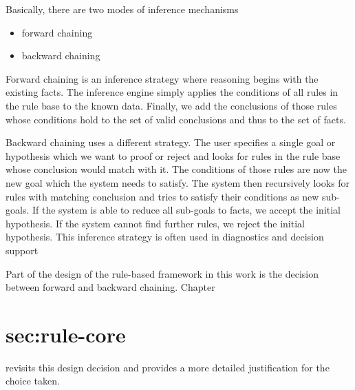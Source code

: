 Basically, there are two modes of inference mechanisms\cite{https://doi.org/10.1002/widm.11}

\begin{itemize}
    \item forward chaining
    \item backward chaining
\end{itemize}


Forward chaining is an inference strategy where reasoning begins with the existing facts.
The inference engine simply applies the conditions of all rules in the rule base to the known data.
Finally,
we add the conclusions of those rules
whose conditions hold to the set of valid conclusions and thus to the set of facts.

Backward chaining uses a different strategy\cite{al2015comparison}.
The user specifies a single goal or hypothesis
which we want to proof or reject and looks for rules in the rule base whose conclusion would match with it.
The conditions of those rules are now the new goal which the system needs to satisfy.
The system then recursively looks for rules with matching conclusion
and tries to satisfy their conditions as new sub-goals.
If the system is able to reduce all sub-goals to facts, we accept the initial hypothesis.
If the system cannot find further rules, we reject the initial hypothesis.
This inference strategy is often used in diagnostics and decision support\cite{https://doi.org/10.1002/widm.11}

Part of the design of the rule-based framework in this work is the decision between forward and backward chaining.
Chapter \section{sec:rule-core} revisits this design decision
and provides a more detailed justification for the choice taken.
